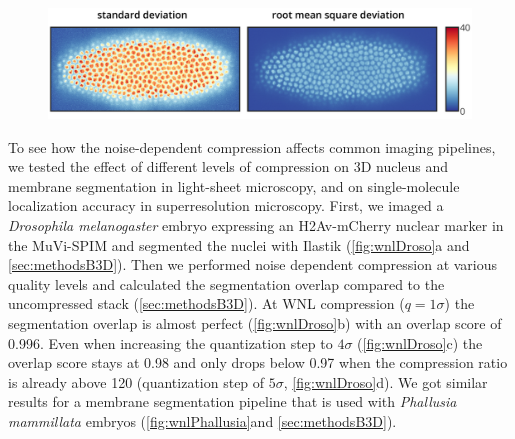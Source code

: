     \begin{figure}[tpb]
      \centering
      \includegraphics[page=1,width=1\textwidth]{SFig4_RMSDvsSD_rotated}
      \label{fig:RMSD}
    \end{figure}

    To see how the noise-dependent compression affects common imaging pipelines, we tested the effect of different levels of compression on 3D nucleus and membrane segmentation in light-sheet microscopy, and on single-molecule localization accuracy in superresolution microscopy.
    First, we imaged a \textit{Drosophila melanogaster} embryo expressing an H2Av-mCherry nuclear marker in the MuVi-SPIM and segmented the nuclei with Ilastik \cite{sommer_ilastik:_2011} (\autoref{fig:wnlDroso}a and \autoref{sec:methodsB3D}). Then we performed noise dependent compression at various quality levels and calculated the segmentation overlap compared to the uncompressed stack (\autoref{sec:methodsB3D}). At WNL compression ($q=1 \sigma$) the segmentation overlap is almost perfect (\autoref{fig:wnlDroso}b) with an overlap score of 0.996. Even when increasing the quantization step to $4\sigma$ (\autoref{fig:wnlDroso}c) the overlap score stays at 0.98 and only drops below 0.97 when the compression ratio is already above 120 (quantization step of $5\sigma$, \autoref{fig:wnlDroso}d).
    We got similar results for a membrane segmentation pipeline that is used with \textit{Phallusia mammillata} embryos (\autoref{fig:wnlPhallusia}and \autoref{sec:methodsB3D}).

